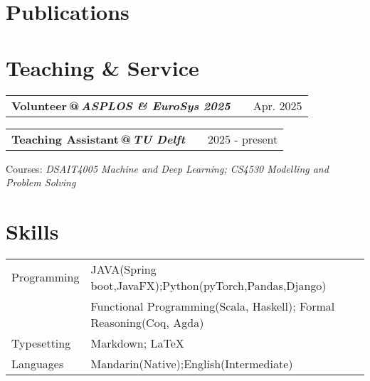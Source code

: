 \documentclass[a4paper,12pt]{article}
\makeatletter
\newenvironment{jobshort}[2]
    {
    \begin{tabularx}{\linewidth}{@{}l X r@{}}
    \textbf{#1} & \hfill &  #2 \\[3.75pt]
    \end{tabularx}
    }
    {
    }
\newcommand{\RoleAt}[2]{\textbf{#1}\,{\color{gray70}@}\,{\normalfont\itshape #2}}
\makeatother
\begin{document}
\section{Publications}
\begin{refsection}
\nocite{*}
\printbibliography[heading=none]
\end{refsection}

\section{Teaching \& Service}
\begin{jobshort}{\RoleAt{Volunteer}{ASPLOS \& EuroSys 2025}}{Apr. 2025}\end{jobshort}
\begin{jobshort}{\RoleAt{Teaching Assistant}{TU Delft}}{2025 - present}\end{jobshort}
\noindent Courses: \textit{ DSAIT4005 Machine and Deep Learning; CS4530 Modelling and Problem Solving
}


\section{Skills} \begin{tabularx}{\linewidth}{@{}l X@{}}Programming & \normalsize{JAVA(Spring boot,JavaFX);Python(pyTorch,Pandas,Django)} \\
 & \normalsize{Functional Programming(Scala, Haskell); Formal Reasoning(Coq, Agda)}\\ Typesetting & \normalsize{Markdown; \textrm{\LaTeX}}\\    Languages & \normalsize{Mandarin(Native);English(Intermediate)}\\   \end{tabularx}

\vfill
\end{document}
